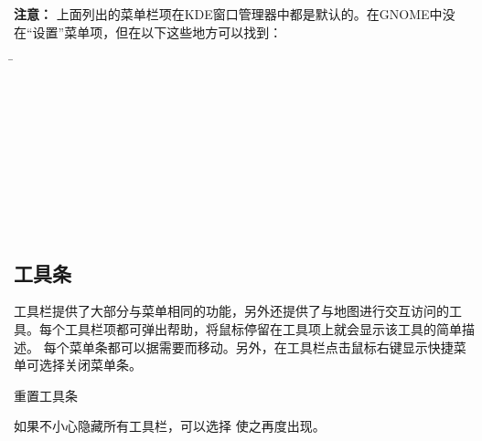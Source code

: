 \textbf{注意：} \nix 上面列出的菜单栏项在KDE窗口管理器中都是默认的。在GNOME中没在“设置”菜单项，但在以下这些地方可以找到：

\begin{tabbing}
 \hspace{3cm}\=
 \\
 \hspace{3cm}\>
\\
 \hspace{3cm}\>
\\
 \hspace{3cm}\>
\\
\hspace{3cm}\>
 \\
 \hspace{3cm}\>
 \\
   \hspace{3cm}\>
 \\
 \hspace{3cm}\>
 \\
 \hspace{3cm}\>
 \\
 \hspace{3cm}\>
 \\
\end{tabbing}


\subsection{工具条}\label{label_toolbars}

工具栏提供了大部分与菜单相同的功能，另外还提供了与地图进行交互访问的工具。每个工具栏项都可弹出帮助，将鼠标停留在工具项上就会显示该工具的简单描述。
每个菜单条都可以据需要而移动。另外，在工具栏点击鼠标右键显示快捷菜单可选择关闭菜单条。

\begin{Tip}
\caption{\textsc{重置工具条}} 
如果不小心隐藏所有工具栏，可以选择  \arrow {} 使之再度出现。
\end{Tip}

